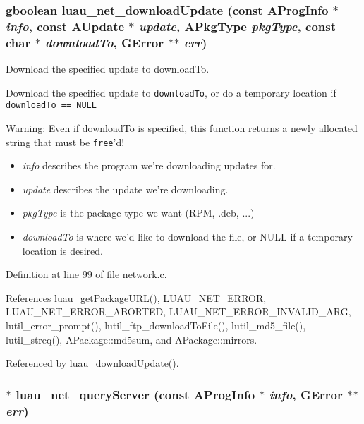 \subsubsection{\setlength{\rightskip}{0pt plus 5cm}gboolean luau\_\-net\_\-download\-Update (const {\bf AProg\-Info} $\ast$ {\em info}, const {\bf AUpdate} $\ast$ {\em update}, {\bf APkg\-Type} {\em pkg\-Type}, const char $\ast$ {\em download\-To}, GError $\ast$$\ast$ {\em err})}\label{network_8c_a1}


Download the specified update to download\-To. 

Download the specified update to {\tt download\-To}, or do a temporary location if {\tt download\-To == NULL} \begin{Desc}
\item[Warning:]Even if download\-To is specified, this function returns a newly allocated string that must be {\tt free}'d!\end{Desc}
\begin{itemize}
\item {\em info\/} describes the program we're downloading updates for. \item {\em update\/} describes the update we're downloading. \item {\em pkg\-Type\/} is the package type we want (RPM, .deb, ...) \item {\em download\-To\/} is where we'd like to download the file, or NULL if a temporary location is desired. 
\end{itemize}


Definition at line 99 of file network.c.

References luau\_\-get\-Package\-URL(), LUAU\_\-NET\_\-ERROR, LUAU\_\-NET\_\-ERROR\_\-ABORTED, LUAU\_\-NET\_\-ERROR\_\-INVALID\_\-ARG, lutil\_\-error\_\-prompt(), lutil\_\-ftp\_\-download\-To\-File(), lutil\_\-md5\_\-file(), lutil\_\-streq(), APackage::md5sum, and APackage::mirrors.

Referenced by luau\_\-download\-Update().
\subsubsection{$\ast$ luau\_\-net\_\-query\-Server (const {\bf AProg\-Info} $\ast$ {\em info}, GError $\ast$$\ast$ {\em err})}\label{network_8c_a0}


